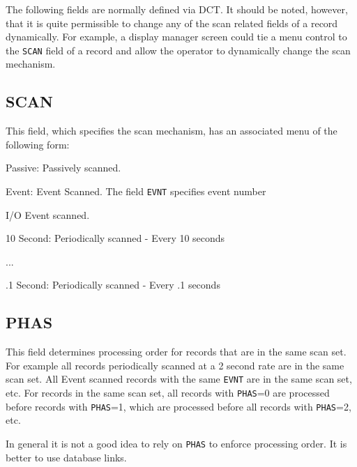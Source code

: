 The following fields are normally defined via DCT. It should be noted, however, that it is quite permissible to change any 
of the scan related fields of a record dynamically. For example, a display manager screen could tie a menu control to the 
\verb|SCAN| field of a record and allow the operator to dynamically change the scan mechanism.

\subsection{SCAN}

This field, which specifies the scan mechanism, has an associated menu of the following form:

\begin{description}
\item {}Passive:  Passively scanned.

\item {}Event:  Event Scanned. The field \verb|EVNT| specifies event number

\item {}I/O Event scanned.

\item 10 Second:  Periodically scanned - Every 10 seconds

\item ...

\item .1 Second:  Periodically scanned - Every .1 seconds

\end{description}

\subsection{PHAS}

This field determines processing order for records that are in the same scan set. For example all records periodically 
scanned at a 2 second rate are in the same scan set. All Event scanned records with the same \verb|EVNT| are in the same scan 
set, etc. For records in the same scan set, all records with \verb|PHAS|=0 are processed before records with \verb|PHAS|=1, which are 
processed before all records with \verb|PHAS|=2, etc.

In general it is not a good idea to rely on \verb|PHAS| to enforce processing order. It is better to use database links.

